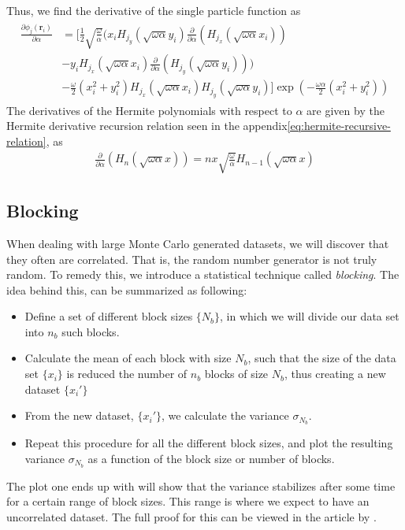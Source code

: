 \documentclass[11pt]{article}
\begin{document}
Thus, we find the derivative of the single particle function as
\begin{align}
	\begin{split}
		\frac{\partial \phi_j(\mathbf{r}_i)}{\partial \alpha} &= \bigg[ \frac{1}{2}\sqrt{\frac{\omega}{\alpha}}\bigg( x_i H_{j_y} (\sqrt{\omega\alpha} y_i) \frac{\partial}{\partial \alpha}\left( H_{j_x} (\sqrt{\omega\alpha}x_i) \right) \\
		&- y_i H_{j_x} (\sqrt{\omega\alpha}x_i) \frac{\partial}{\partial \alpha}\left( H_{j_y} (\sqrt{\omega\alpha}y_i) \right)\bigg) \\
		&- \frac{\omega}{2}(x_i^2 + y_i^2) H_{j_x} (\sqrt{\omega\alpha}x_i) H_{j_y} (\sqrt{\omega\alpha} y_i) \bigg] \exp{\left(-\frac{\omega\alpha}{2}\left( x_i^2 + y_i^2 \right)\right)}
	\end{split}
	\label{eq:wf-sp-alpha-derivative}
\end{align}
The derivatives of the Hermite polynomials with respect to $\alpha$ are given by the Hermite derivative recursion relation seen in the appendix\eqref{eq:hermite-recursive-relation}, as
\begin{align}
	\frac{\partial}{\partial\alpha} \left(H_n(\sqrt{\omega\alpha}x)\right) = nx\sqrt{\frac{\omega}{\alpha}} H_{n-1}(\sqrt{\omega\alpha}x)
	\label{eq:hermite-alpha-derivative}
\end{align}

\subsection{Blocking}
When dealing with large Monte Carlo generated datasets, we will discover that they often are correlated. That is, the random number generator is not truly random. To remedy this, we introduce a statistical technique called \textit{blocking}. The idea behind this, can be summarized as following:
\begin{itemize}
	\item Define a set of different block sizes $\{N_b\}$, in which we will divide our data set into $n_b$ such blocks.
	\item Calculate the mean of each block with size $N_b$, such that the size of the data set $\{x_i\}$ is reduced the number of $n_b$ blocks of size $N_b$, thus creating a new dataset $\{x_i'\}$
	\item From the new dataset, $\{x_i'\}$, we calculate the variance $\sigma_{N_b}$.
	\item Repeat this procedure for all the different block sizes, and plot the resulting variance $\sigma_{N_b}$ as a function of the block size or number of blocks.
\end{itemize}
The plot one ends up with will show that the variance stabilizes after some time for a certain range of block sizes. This range is where we expect to have an uncorrelated dataset. The full proof for this can be viewed in the article by \citet{flyvbjerg1989error}.
\end{document}

